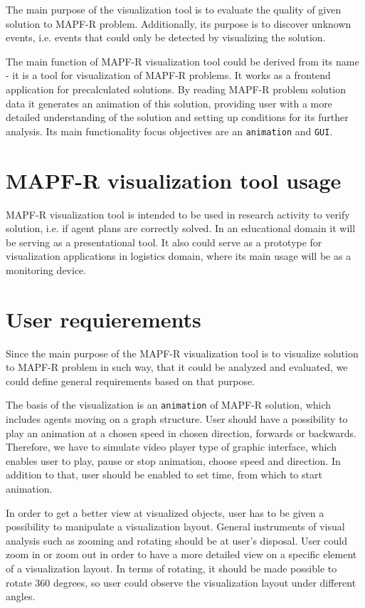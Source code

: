 \documentclass[thesis=B,english]{FITthesis}[2019/12/23]
\begin{document}
The main purpose of the visualization tool is to evaluate the quality of given solution to MAPF-R problem. Additionally, its purpose is to discover unknown events, i.e. events that could only be detected by visualizing the solution.  

The main function of MAPF-R visualization tool could be derived from its name - it is a tool for visualization of MAPF-R problems. It works as a frontend application for precalculated solutions. By reading MAPF-R problem solution data it generates an animation of this solution, providing user with a more detailed understanding of the solution and setting up conditions for its further analysis. Its main functionality focus objectives are an \verb|animation| and \verb|GUI|.

\section{MAPF-R visualization tool usage}

MAPF-R visualization tool is intended to be used in research activity to verify solution, i.e. if agent plans are correctly solved. In an educational domain it will be serving as a presentational tool. It also could serve as a prototype for  visualization applications in logistics domain, where its main usage will be as a monitoring device.

\section{User requierements}

Since the main purpose of the MAPF-R visualization tool is to visualize solution to MAPF-R problem in such way, that it could be analyzed and evaluated, we could define general requirements based on that purpose. 

The basis of the visualization is an \verb|animation| of MAPF-R solution, which includes agents moving on a graph structure. User should have a possibility to play an animation at a chosen speed in chosen direction, forwards or backwards. Therefore, we have to simulate video player type of graphic interface, which enables user to play, pause or stop animation, choose speed and direction. In addition to that, user should be enabled to set time, from which to start animation.

In order to get a better view at visualized objects, user has to be given a possibility to manipulate a visualization layout. General instruments of visual analysis such as zooming and rotating should be at user's disposal. User could zoom in or zoom out in order to have a more detailed view on a specific element of a visualization layout. In terms of rotating, it should be made possible to rotate 360 degrees, so user could observe the visualization layout under different angles.
\end{document}
